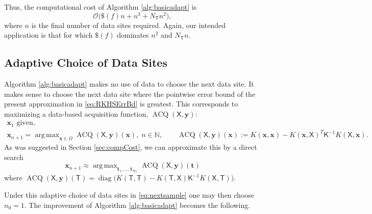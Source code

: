 \documentclass[]{mcom-l}
\theoremstyle{remark}
\DeclareMathOperator*{\argmax}{arg\,max}
\DeclareMathOperator{\ACQ}{ACQ}
\DeclareMathOperator{\diag}{diag}
\newcommand{\NT}{{N_{\mT}}}
\newcommand{\naturals}{{\mathbb{N}}}
\newcommand{\mK}{\mathsf{K}}
\newcommand{\mT}{\mathsf{T}}
\newcommand{\mX}{\mathsf{X}}
\newcommand{\bx}{{\boldsymbol{x}}}
\newcommand{\by}{{\boldsymbol{y}}}
\newcommand{\bt}{{\boldsymbol{t}}}
\newcommand{\Order}{\mathcal{O}}
\begin{document}
Thus, the computational cost of Algorithm \ref{alg:basicadapt} is
\begin{equation} \label{eq:compcostbasic}
\Order\bigl(\$(f)n + n^3 + \NT n^2 \bigr),
\end{equation}
where $n$ is the final number of data sites required.  Again, our intended application is that for which $\$(f)$ dominates $n^2$ and $\NT n$.  



\subsection{Adaptive Choice of Data Sites }  \label{sec:adaptSites}

Algorithm \ref{alg:basicadapt} makes no use of data to choose the next data site.  It makes sense to choose the next data site where the pointwise error bound of the present approximation in \eqref{eq:RKHSErrBd} is greatest.  This corresponds to maximizing a data-based acquisition function, $\ACQ(\mX,\by)$:
\begin{subequations} \label{eq:nextsample}
\begin{gather} 
\bx_1 \text{ given}, \\
 \bx_{n+1} = \argmax_{\bx \in \Omega} \ACQ(\mX,\by)(\bx), \; n \in \naturals,  \qquad \ACQ(\mX,\by)(\bx) := K(\bx,\bx) - K(\bx,\mX)^T \mK^{-1} K(\mX,\bx).
\end{gather}
\end{subequations}
As was suggested in Section \ref{sec:compCost}, we can approximate this by a direct search
\begin{equation} \label{eq:nextsampleAPPX}
\bx_{n+1} \approx \argmax_{\bt_1, \ldots, \bt_\NT} \ACQ(\mX,\by)(\bt)
\end{equation}
where $\ACQ(\mX,\by)(\mT) = \diag\bigl(K(\mT,\mT) - K(\mT,\mX) \mK^{-1} K(\mX,\mT) \bigr)$.  

Under this adaptive choice of data sites in  \eqref{eq:nextsample} one may then choose $n_0 = 1$.  The improvement of Algorithm \ref{alg:basicadapt} becomes the following. 
\end{document}
